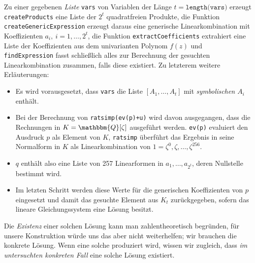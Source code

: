 \documentclass[11pt]{article}
\newcommand{\sbr}[1]{\ensuremath{\left[#1\right]}}
\newcommand{\Q}{\mathbbm{Q}}
\begin{document}
Zu einer gegebenen \emph{Liste} \texttt{vars} von Variablen der Länge
$t=\texttt{length(vars)}$ erzeugt \texttt{create\-Products} eine Liste der
$2^t$ quadratfreien Produkte, die Funktion \texttt{createGenericExpression}
erzeugt daraus eine generische Linearkombination mit Koeffizienten
$a_i,\ i=1,\ldots,2^t$, die Funktion \texttt{extractCoefficients} extrahiert
eine Liste der Koeffizienten aus dem univarianten Polynom $f(z)$ und
\texttt{findExpression} fasst schließlich alles zur Berechnung der gesuchten
Linearkombination zusammen, falls diese existiert. Zu letzterem weitere
Erläuterungen:
\begin{itemize}
\item Es wird vorausgesetzt, dass \texttt{vars} die Liste
  $\sbr{A_1,\ldots,A_t}$ mit \emph{symbolischen $A_i$} enthält.
\item Bei der Berechnung von \texttt{ratsimp(ev(p)+u)} wird davon ausgegangen,
  dass die Rechnungen in $K=\Q[\zeta]$ ausgeführt werden. \texttt{ev(p)}
  evaluiert den Ausdruck $p$ als Element von $K$, \texttt{ratsimp} überführt
  das Ergebnis in seine Normalform in $K$ als Linearkombination von
  $1=\zeta^0, \zeta,\ldots, \zeta^{256}$.   
\item $q$ enthält also eine Liste von 257 Linearformen in
  $a_1,\ldots,a_{2^t}$, deren Nullstelle bestimmt wird.
\item Im letzten Schritt werden diese Werte für die generischen Koeffizienten
  von $p$ eingesetzt und damit das gesuchte Element aus $K_t$ zurückgegeben,
  sofern das lineare Gleichungssystem eine Lösung besitzt. 
\end{itemize}
Die \emph{Existenz} einer solchen Lösung kann man zahlentheoretisch begründen,
für unsere Konstruktion würde uns das aber nicht weiterhelfen; wir brauchen
die konkrete Lösung. Wenn eine solche produziert wird, wissen wir zugleich,
dass \emph{im untersuchten konkreten Fall} eine solche Lösung existiert. 
\end{document}
